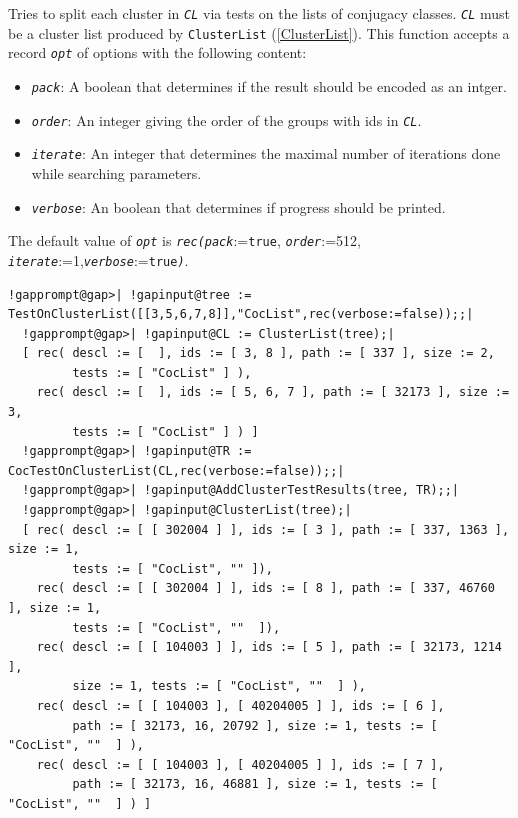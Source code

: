\documentclass[a4paper,11pt]{report}
\begin{document}
{{{ Tries to split each cluster in \mbox{\texttt{\mdseries\slshape CL}} via tests on the lists of conjugacy classes. \mbox{\texttt{\mdseries\slshape CL}} must be a cluster list produced by \texttt{ClusterList} (\ref{ClusterList}). This function accepts a record \mbox{\texttt{\mdseries\slshape opt}} of options with the following content: 
\begin{itemize}
\item  \mbox{\texttt{\mdseries\slshape pack}}: A boolean that determines if the result should be encoded as an intger. 
\item  \mbox{\texttt{\mdseries\slshape order}}: An integer giving the order of the groups with ids in \mbox{\texttt{\mdseries\slshape CL}}. 
\item  \mbox{\texttt{\mdseries\slshape iterate}}: An integer that determines the maximal number of iterations done while
searching parameters. 
\item  \mbox{\texttt{\mdseries\slshape verbose}}: An boolean that determines if progress should be printed. 
\end{itemize}
 The default value of \mbox{\texttt{\mdseries\slshape opt}} is \mbox{\texttt{\mdseries\slshape rec(pack}}:=\texttt{true}, \mbox{\texttt{\mdseries\slshape order}}:=512, \mbox{\texttt{\mdseries\slshape iterate}}:=1,\mbox{\texttt{\mdseries\slshape verbose}}:=\texttt{true}\mbox{\texttt{\mdseries\slshape )}}. 
\begin{Verbatim}[commandchars=!@|,fontsize=\small,frame=single,label=Example]
  !gapprompt@gap>| !gapinput@tree := TestOnClusterList([[3,5,6,7,8]],"CocList",rec(verbose:=false));;|
  !gapprompt@gap>| !gapinput@CL := ClusterList(tree);|
  [ rec( descl := [  ], ids := [ 3, 8 ], path := [ 337 ], size := 2,
         tests := [ "CocList" ] ),
    rec( descl := [  ], ids := [ 5, 6, 7 ], path := [ 32173 ], size := 3,
         tests := [ "CocList" ] ) ]
  !gapprompt@gap>| !gapinput@TR := CocTestOnClusterList(CL,rec(verbose:=false));;|
  !gapprompt@gap>| !gapinput@AddClusterTestResults(tree, TR);;|
  !gapprompt@gap>| !gapinput@ClusterList(tree);|
  [ rec( descl := [ [ 302004 ] ], ids := [ 3 ], path := [ 337, 1363 ], size := 1,
         tests := [ "CocList", "" ]),
    rec( descl := [ [ 302004 ] ], ids := [ 8 ], path := [ 337, 46760 ], size := 1,
         tests := [ "CocList", ""  ]),
    rec( descl := [ [ 104003 ] ], ids := [ 5 ], path := [ 32173, 1214 ],
         size := 1, tests := [ "CocList", ""  ] ),
    rec( descl := [ [ 104003 ], [ 40204005 ] ], ids := [ 6 ],
         path := [ 32173, 16, 20792 ], size := 1, tests := [ "CocList", ""  ] ),
    rec( descl := [ [ 104003 ], [ 40204005 ] ], ids := [ 7 ],
         path := [ 32173, 16, 46881 ], size := 1, tests := [ "CocList", ""  ] ) ]
\end{Verbatim}
 }

}}
\end{document}
